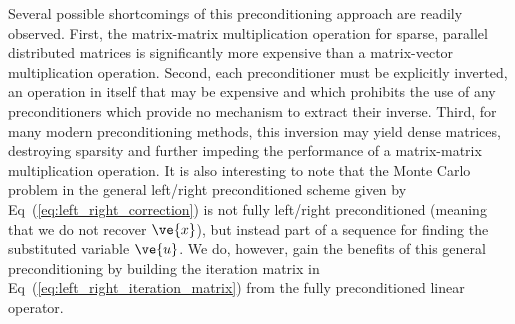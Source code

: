 \documentclass[letterpaper,12pt]{article}
\begin{document}
Several possible shortcomings of this preconditioning approach are
readily observed. First, the matrix-matrix multiplication operation
for sparse, parallel distributed matrices is significantly more
expensive than a matrix-vector multiplication operation. Second, each
preconditioner must be explicitly inverted, an operation in itself
that may be expensive and which prohibits the use of any
preconditioners which provide no mechanism to extract their
inverse. Third, for many modern preconditioning methods, this
inversion may yield dense matrices, destroying sparsity and further
impeding the performance of a matrix-matrix multiplication
operation. It is also interesting to note that the Monte Carlo problem
in the general left/right preconditioned scheme given by
Eq~(\ref{eq:left_right_correction}) is not fully left/right
preconditioned (meaning that we do not recover $\ve{x}$), but instead
part of a sequence for finding the substituted variable $\ve{u}$. We
do, however, gain the benefits of this general preconditioning by
building the iteration matrix in
Eq~(\ref{eq:left_right_iteration_matrix}) from the fully
preconditioned linear operator.

\end{document}

